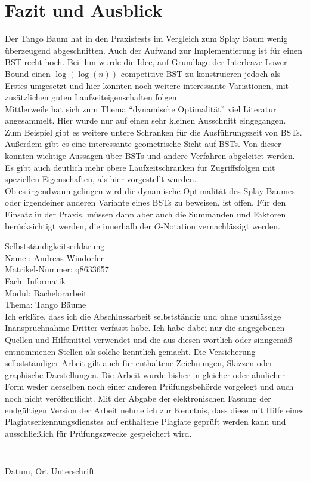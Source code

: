 \documentclass[a4paper,12pt]{article}
\begin{document}
\section{Fazit und Ausblick}
Der Tango Baum hat in den Praxistests im Vergleich zum Splay Baum wenig überzeugend abgeschnitten. Auch der Aufwand zur Implementierung ist für einen BST recht hoch. Bei ihm wurde die Idee, auf Grundlage der Interleave Lower Bound einen $\log\left(\log\left(n\right)\right)$-competitive BST zu konstruieren jedoch als Erstes umgesetzt und hier könnten noch weitere interessante Variationen, mit zusätzlichen guten Laufzeiteigenschaften folgen. \\
Mittlerweile hat sich zum Thema \enquote{dynamische Optimalität} viel Literatur angesammelt. Hier wurde nur auf einen sehr kleinen Ausschnitt eingegangen. Zum Beispiel gibt es  weitere untere Schranken für die Ausführungszeit von BSTs. Außerdem gibt es eine interessante geometrische Sicht auf BSTs. Von dieser konnten wichtige Aussagen über BSTs und andere Verfahren abgeleitet werden. Es gibt auch deutlich mehr obere Laufzeitschranken für Zugriffsfolgen mit speziellen Eigenschaften, als  hier vorgestellt wurden. \\
Ob es irgendwann gelingen wird die dynamische Optimalität des Splay Baumes oder irgendeiner anderen Variante eines BSTs zu beweisen, ist offen. Für den Einsatz in der Praxis, müssen dann aber auch die Summanden und Faktoren berücksichtigt werden, die innerhalb der $O$-Notation vernachlässigt werden.


\newpage
\listoffigures
\newpage
\Large
\noindent Selbstständigkeitserklärung\bigskip\\
\normalsize
\noindent Name : Andreas Windorfer\\
Matrikel-Nummer: q8633657\\
Fach: Informatik\\
Modul: Bachelorarbeit\\
Thema: Tango Bäume \bigskip\\


\noindent Ich erkläre, dass ich die Abschlussarbeit selbstständig und ohne unzulässige Inanspruchnahme Dritter verfasst habe. Ich habe dabei nur die angegebenen Quellen und Hilfsmittel verwendet und die aus diesen wörtlich oder sinngemäß entnommenen Stellen als solche kenntlich gemacht. Die Versicherung selbstständiger Arbeit gilt auch für enthaltene Zeichnungen, Skizzen oder graphische Darstellungen. Die Arbeit wurde bisher in gleicher oder ähnlicher Form weder derselben noch einer anderen Prüfungsbehörde vorgelegt und auch noch nicht veröffentlicht. Mit der Abgabe der elektronischen Fassung der endgültigen Version der Arbeit nehme ich zur Kenntnis, dass diese mit Hilfe eines Plagiatserkennungsdienstes auf enthaltene Plagiate geprüft werden kann und ausschließlich für Prüfungszwecke gespeichert wird.\\

\vspace{50pt}
\noindent\rule{5cm}{.4pt}\hfill\rule{5cm}{.4pt}\par
\noindent Datum, Ort \hfill Unterschrift
                       



\newpage


\end{document}
